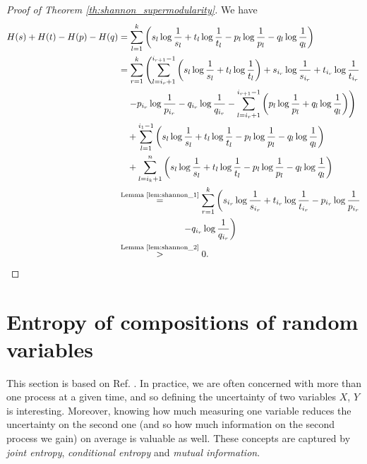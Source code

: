 \begin{proof}[Proof of Theorem \ref{th:shannon_supermodularity}]
    We have
    \begin{align}
        H(s) + H(t) - H(p) - H(q)
        &= \sum_{l=1}^{k} \left( s_l \log \frac{1}{s_l} + t_l \log \frac{1}{t_l} - p_l \log \frac{1}{p_l} - q_l \log \frac{1}{q_l} \right) \\
        &= \sum_{r=1}^{k} \left( \sum_{l=i_r+1}^{i_{r+1}-1} \left( s_l \log \frac{1}{s_l} + t_l \log \frac{1}{t_l} \right)
        + s_{i_r} \log \frac{1}{s_{i_r}} + t_{i_r} \log \frac{1}{t_{i_r}} \right. \nonumber\\
        &\quad \left. - p_{i_r} \log \frac{1}{p_{i_r}} - q_{i_r} \log \frac{1}{q_{i_r}} 
        - \sum_{l=i_r+1}^{i_{r+1}-1} \left( p_l \log \frac{1}{p_l} + q_l \log \frac{1}{q_l} \right) \right) \nonumber \\
        &\quad + \sum_{l=1}^{i_1 - 1} \left( s_l \log \frac{1}{s_l} + t_l \log \frac{1}{t_l} 
        - p_l \log \frac{1}{p_l} - q_l \log \frac{1}{q_l} \right) \nonumber \\
        &\quad + \sum_{l=i_k+1}^{n} \left( s_l \log \frac{1}{s_l} + t_l \log \frac{1}{t_l} 
        - p_l \log \frac{1}{p_l} - q_l \log \frac{1}{q_l} \right) \\
        &\overset{\text{Lemma \ref{lem:shannon_1}}}{=} \sum_{r=1}^{k} \left( s_{i_r} \log \frac{1}{s_{i_r}} + t_{i_r} \log \frac{1}{t_{i_r}} 
        - p_{i_r} \log \frac{1}{p_{i_r}} \right.\nonumber\\
        &\quad \quad \quad \quad \quad \quad \quad \left.- q_{i_r} \log \frac{1}{q_{i_r}} \right) \\
        &\overset{\text{Lemma \ref{lem:shannon_2}}}{>} 0. \qedhere
    \end{align}
\end{proof}




\newpage

\section{Entropy of compositions of random variables} \label{app:shannon_compositions}

\setcounter{equation}{0}

This section is based on Ref. \cite[pp. 16--22]{cover_elements_2006}. In practice, we are often concerned with more than one process at a given time, and so defining the uncertainty of two variables $X$, $Y$ is interesting. Moreover, knowing how much measuring one variable reduces the uncertainty on the second one (and so how much information on the second process we gain) on average is valuable as well. These concepts are captured by \textit{joint entropy}, \textit{conditional entropy} and \textit{mutual information}.

